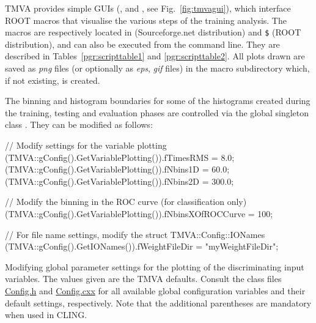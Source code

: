 TMVA provides simple GUIs (,
 and 
, see
Fig.~\ref{fig:tmvagui}), which interface ROOT macros that visualise
the various steps of the training analysis. The macros are
respectively located in  (Sourceforge.net
distribution) and {\tt \$} (ROOT
distribution), and can also be executed from the command line. They
are described in Tables~\ref{pgr:scripttable1} and
\ref{pgr:scripttable2}. All plots drawn are saved as {\em png} files
(or optionally as {\em eps}, {\em gif} files) in the macro
subdirectory  which, if not existing, is created.

The binning and histogram boundaries for some of the histograms
created during the training, testing and evaluation phases are
controlled via the global singleton class . They
can be modified as follows:
\begin{codeexample}
\begin{tmvacode}
// Modify settings for the variable plotting
(TMVA::gConfig().GetVariablePlotting()).fTimesRMS = 8.0;
(TMVA::gConfig().GetVariablePlotting()).fNbins1D  = 60.0;
(TMVA::gConfig().GetVariablePlotting()).fNbins2D  = 300.0;

// Modify the binning in the ROC curve (for classification only)
(TMVA::gConfig().GetVariablePlotting()).fNbinsXOfROCCurve = 100;

// For file name settings, modify the struct TMVA::Config::IONames
(TMVA::gConfig().GetIONames()).fWeightFileDir = "myWeightFileDir";
\end{tmvacode}
\caption[.]{\codeexampleCaptionSize Modifying global parameter
  settings for the plotting of the discriminating input variables. The
  values given are the TMVA defaults. Consult the class files
  \href{http://tmva.svn.sourceforge.net/viewvc/tmva/trunk/TMVA/src/Config.h?view=markup}{Config.h}
  and
  \href{http://tmva.svn.sourceforge.net/viewvc/tmva/trunk/TMVA/src/Config.cxx?view=markup}{Config.cxx}
  for all available global configuration variables and their default
  settings, respectively. Note that the additional parentheses are
  mandatory when used in CLING.}
\label{ce:gconfig}
\end{codeexample}
